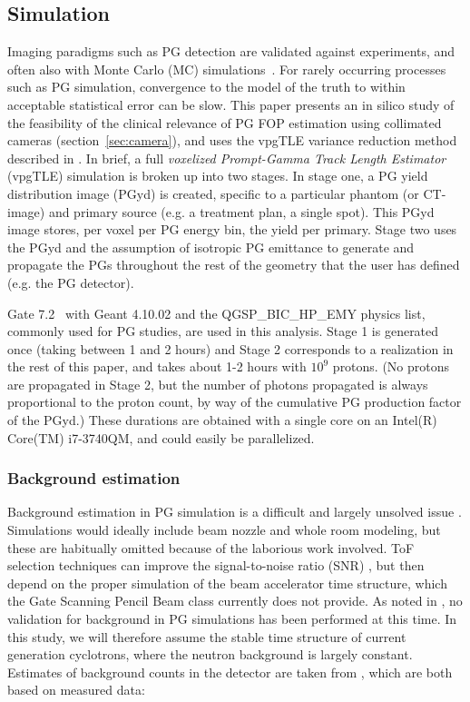 \documentclass[a4paper,english]{article}
\begin{document}

\subsection{Simulation}

Imaging paradigms such as PG detection are validated against experiments, and often also with Monte Carlo (MC) simulations~\citep{Moteabbed2011,Gueth2013,Robert2013,Golnik2014a,Janssen2014}. For rarely occurring processes such as PG simulation, convergence to the model of the truth to within acceptable statistical error can be slow. This paper presents an in silico study of the feasibility of the clinical relevance of PG FOP estimation using collimated cameras (section~\ref{sec:camera}), and uses the vpgTLE variance reduction method described in \cite{Huisman2016}. In brief, a full \emph{voxelized Prompt-Gamma Track Length Estimator} (vpgTLE) simulation is broken up into two stages. In stage one, a PG yield distribution image (PGyd) is created, specific to a particular phantom (or CT-image) and primary source (e.g. a treatment plan, a single spot). This PGyd image stores, per voxel per PG energy bin, the yield per primary. Stage two uses the PGyd and the assumption of isotropic PG emittance to generate and propagate the PGs throughout the rest of the geometry that the user has defined (e.g. the PG detector).

Gate 7.2~\citep{Jan2009,Sarrut2014} with Geant 4.10.02 and the QGSP\_BIC\_HP\_EMY physics list, commonly used for PG studies, are used in this analysis. Stage 1 is generated once (taking between 1 and 2 hours) and Stage 2 corresponds to a realization in the rest of this paper, and takes about 1-2 hours with $10^9$ protons. (No protons are propagated in Stage 2, but the number of photons propagated is always proportional to the proton count, by way of the cumulative PG production factor of the PGyd.) These durations are obtained with a single core on an Intel(R) Core(TM) i7-3740QM, and could easily be parallelized.

\subsubsection{Background estimation}

Background estimation in PG simulation is a difficult and largely unsolved issue \citep{Huisman2016,Sterpin2015,Pinto2014a,Perali2014}. Simulations would ideally include beam nozzle and whole room modeling, but these are habitually omitted because of the laborious work involved. ToF selection techniques can improve the signal-to-noise ratio (SNR) \citep{Testa2008}, but then depend on the proper simulation of the beam accelerator time structure, which the Gate Scanning Pencil Beam class currently does not provide. As noted in \cite{Huisman2016}, no validation for background in PG simulations has been performed at this time. In this study, we will therefore assume the stable time structure of current generation cyclotrons, where the neutron background is largely constant. Estimates of background counts in the detector are taken from \cite{Pinto2014a,Perali2014}, which are both based on measured data:
\end{document}
